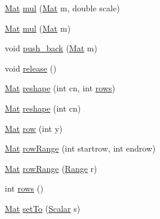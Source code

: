 \begin{DoxyCompactItemize}
\item 
\mbox{\hyperlink{classorg_1_1opencv_1_1core_1_1_mat}{Mat}} \mbox{\hyperlink{classorg_1_1opencv_1_1core_1_1_mat_a43e95787eea4de307230ceeb14bba8f6}{mul}} (\mbox{\hyperlink{classorg_1_1opencv_1_1core_1_1_mat}{Mat}} m, double scale)
\item 
\mbox{\hyperlink{classorg_1_1opencv_1_1core_1_1_mat}{Mat}} \mbox{\hyperlink{classorg_1_1opencv_1_1core_1_1_mat_afa27812124a1a17a0b4c003637b7a27b}{mul}} (\mbox{\hyperlink{classorg_1_1opencv_1_1core_1_1_mat}{Mat}} m)
\item 
void \mbox{\hyperlink{classorg_1_1opencv_1_1core_1_1_mat_a137ee1d0feab4d3db45755e2b6d46c91}{push\+\_\+back}} (\mbox{\hyperlink{classorg_1_1opencv_1_1core_1_1_mat}{Mat}} m)
\item 
void \mbox{\hyperlink{classorg_1_1opencv_1_1core_1_1_mat_afb0f872783792b1ba415c2dfcf088a14}{release}} ()
\item 
\mbox{\hyperlink{classorg_1_1opencv_1_1core_1_1_mat}{Mat}} \mbox{\hyperlink{classorg_1_1opencv_1_1core_1_1_mat_ac272e7518dba0da8e7480df63163040b}{reshape}} (int cn, int \mbox{\hyperlink{classorg_1_1opencv_1_1core_1_1_mat_a1e925483fbe84a9dab2499cf91c17c84}{rows}})
\item 
\mbox{\hyperlink{classorg_1_1opencv_1_1core_1_1_mat}{Mat}} \mbox{\hyperlink{classorg_1_1opencv_1_1core_1_1_mat_a544b911ef4cf5e755658a1f8dd5f0b7d}{reshape}} (int cn)
\item 
\mbox{\hyperlink{classorg_1_1opencv_1_1core_1_1_mat}{Mat}} \mbox{\hyperlink{classorg_1_1opencv_1_1core_1_1_mat_a39db00627baab6486e3065920941b9ec}{row}} (int y)
\item 
\mbox{\hyperlink{classorg_1_1opencv_1_1core_1_1_mat}{Mat}} \mbox{\hyperlink{classorg_1_1opencv_1_1core_1_1_mat_a182dbb37bbaa19e65cfcb99cf4d03fbe}{row\+Range}} (int startrow, int endrow)
\item 
\mbox{\hyperlink{classorg_1_1opencv_1_1core_1_1_mat}{Mat}} \mbox{\hyperlink{classorg_1_1opencv_1_1core_1_1_mat_a05a7c23da0150252d907e58489808b51}{row\+Range}} (\mbox{\hyperlink{classorg_1_1opencv_1_1core_1_1_range}{Range}} r)
\item 
int \mbox{\hyperlink{classorg_1_1opencv_1_1core_1_1_mat_a1e925483fbe84a9dab2499cf91c17c84}{rows}} ()
\item 
\mbox{\hyperlink{classorg_1_1opencv_1_1core_1_1_mat}{Mat}} \mbox{\hyperlink{classorg_1_1opencv_1_1core_1_1_mat_a9316a305061d8ef51b7e7355d5e7440d}{set\+To}} (\mbox{\hyperlink{classorg_1_1opencv_1_1core_1_1_scalar}{Scalar}} s)
\item 

\end{DoxyCompactItemize}

